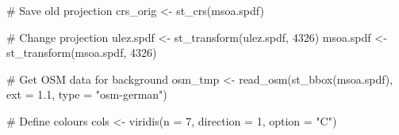 \documentclass[
  letterpaper,
]{scrbook}
\newenvironment{Shaded}{\begin{snugshade}}{\end{snugshade}}
\newcommand{\AttributeTok}[1]{\textcolor[rgb]{0.40,0.45,0.13}{#1}}
\newcommand{\CommentTok}[1]{\textcolor[rgb]{0.37,0.37,0.37}{#1}}
\newcommand{\DecValTok}[1]{\textcolor[rgb]{0.68,0.00,0.00}{#1}}
\newcommand{\FloatTok}[1]{\textcolor[rgb]{0.68,0.00,0.00}{#1}}
\newcommand{\FunctionTok}[1]{\textcolor[rgb]{0.28,0.35,0.67}{#1}}
\newcommand{\NormalTok}[1]{\textcolor[rgb]{0.00,0.23,0.31}{#1}}
\newcommand{\OtherTok}[1]{\textcolor[rgb]{0.00,0.23,0.31}{#1}}
\newcommand{\StringTok}[1]{\textcolor[rgb]{0.13,0.47,0.30}{#1}}
\begin{document}
\begin{Shaded}
\begin{Highlighting}[]
\CommentTok{\# Save old projection}
\NormalTok{crs\_orig }\OtherTok{\textless{}{-}} \FunctionTok{st\_crs}\NormalTok{(msoa.spdf)}

\CommentTok{\# Change projection}
\NormalTok{ulez.spdf }\OtherTok{\textless{}{-}} \FunctionTok{st\_transform}\NormalTok{(ulez.spdf, }\DecValTok{4326}\NormalTok{)}
\NormalTok{msoa.spdf }\OtherTok{\textless{}{-}} \FunctionTok{st\_transform}\NormalTok{(msoa.spdf, }\DecValTok{4326}\NormalTok{)}

\CommentTok{\# Get OSM data for background}
\NormalTok{osm\_tmp }\OtherTok{\textless{}{-}} \FunctionTok{read\_osm}\NormalTok{(}\FunctionTok{st\_bbox}\NormalTok{(msoa.spdf), }\AttributeTok{ext =} \FloatTok{1.1}\NormalTok{, }\AttributeTok{type =} \StringTok{"osm{-}german"}\NormalTok{) }

\CommentTok{\# Define colours}
\NormalTok{cols }\OtherTok{\textless{}{-}} \FunctionTok{viridis}\NormalTok{(}\AttributeTok{n =} \DecValTok{7}\NormalTok{, }\AttributeTok{direction =} \DecValTok{1}\NormalTok{, }\AttributeTok{option =} \StringTok{"C"}\NormalTok{)}


\end{Highlighting}
\end{Shaded}
\end{document}
